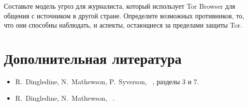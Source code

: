 \begin{esercizio}[2]\label{es:04-modello}
Составьте модель угроз для журналиста, который использует Tor Browser для общения с источником в другой стране. Определите возможных противников, то, что они способны наблюдать, и аспекты, остающиеся за пределами защиты Tor.
\end{esercizio}

\section*{Дополнительная литература}
\begin{itemize}
  \item R.~Dingledine, N.~Mathewson, P.~Syverson, ~\cite{dingledine2004tor}, разделы 3 и 7.
  \item R.~Dingledine, N.~Mathewson, ~\cite{dingledine2006company}.
\end{itemize}
